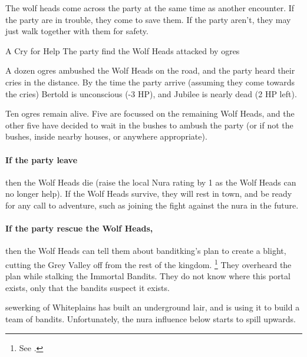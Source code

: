 \begin{multicols}{2}
The wolf heads come across the party at the same time as another encounter.
If the party are in trouble, they come to save them.
If the party aren't, they may just walk together with them for safety.

{A Cry for Help}%
{The party find the Wolf Heads attacked by ogres}%

A dozen ogres ambushed the Wolf Heads on the road, and the party heard their cries in the distance.
By the time the party arrive (assuming they come towards the cries) Bertold is unconscious (-3 HP), and Jubilee is nearly dead (2 HP left).

Ten ogres remain alive.
Five are focussed on the remaining Wolf Heads, and the other five have decided to wait in the bushes to ambush the party (or if not the bushes, inside nearby houses, or anywhere appropriate).

\paragraph{\N If the party leave}
then the Wolf Heads die (raise the local Nura rating by 1 as the Wolf Heads can no longer help).
If the Wolf Heads survive, they will rest in \gls{town}, and be ready for any call to adventure, such as joining the fight against the nura in the future.

\paragraph{If the party rescue the Wolf Heads,}
then the Wolf Heads can tell them about \gls{banditking}'s plan to create a blight, cutting the Grey Valley off from the rest of the kingdom.%
\footnote{See .}
They overheard the plan while stalking the Immortal Bandits.
They do not know where this portal exists, only that the bandits suspect it exists.



\stopcontents[sq]

\label{sewerking}

\startcontents[sq]

\sqminitoc

\noindent
\Gls{sewerking} of Whiteplains has built an underground lair, and is using it to build a team of bandits.
Unfortunately, the nura influence below starts to spill upwards.


\end{multicols}
